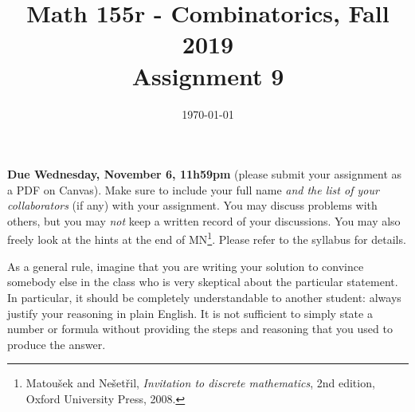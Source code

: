 \documentclass{amsart}
\title[Math 155r, Fall 2019: assignment 9]{Math 155r - Combinatorics, Fall 2019 \\ Assignment 9}
\date{\today}
\theoremstyle{definition}
\begin{document}

\vspace*{-10em}
\maketitle

\textbf{Due Wednesday, November 6, 11h59pm} (please submit your assignment as a PDF on Canvas). Make sure to include your full name \emph{and the list of your collaborators} (if any) with your assignment. You may discuss problems with others, but you may \emph{not} keep a written record of your discussions. You may also freely look at the hints at the end of MN\footnote{Matoušek and Nešetřil, \emph{Invitation to discrete mathematics}, 2nd edition, Oxford University Press, 2008.}. Please refer to the syllabus for details.

As a general rule, imagine that you are writing your solution to convince somebody else in the class who is very skeptical about the particular statement. In particular, it should be completely understandable to another student: always justify your reasoning in plain English. It is not sufficient to simply state a number or formula without providing the steps and reasoning that you used to produce the answer.
\end{document}
